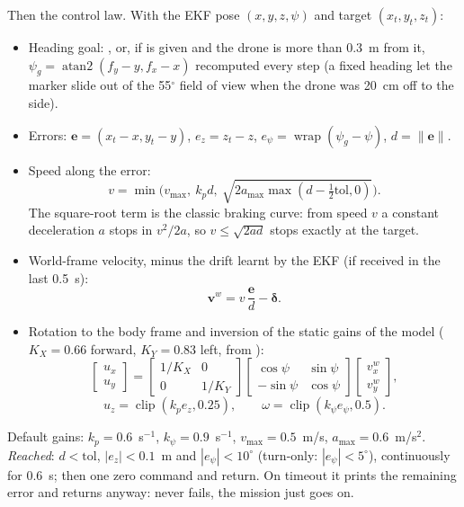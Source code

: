 Then the control law. With the EKF pose $(x,y,z,\psi)$ and target $(x_t,y_t,z_t)$:
\begin{itemize}[nosep]
  \item Heading goal: , or, if  is given and the drone is more than 0.3~m from it,
        $\psi_g = \operatorname{atan2}(f_y - y, f_x - x)$ recomputed every step (a fixed heading let the marker
        slide out of the 55$^\circ$ field of view when the drone was 20~cm off to the side).
  \item Errors: $\mathbf e = (x_t - x, y_t - y)$, $e_z = z_t - z$, $e_\psi = \operatorname{wrap}(\psi_g - \psi)$,
        $d = \lVert\mathbf e\rVert$.
  \item Speed along the error:
        $$ v = \min\Big( v_{\max},\ k_p d,\ \sqrt{2 a_{\max} \max(d - \tfrac{1}{2}\text{tol}, 0)} \Big). $$
        The square-root term is the classic braking curve: from speed $v$ a constant deceleration $a$ stops in
        $v^2/2a$, so $v \le \sqrt{2ad}$ stops exactly at the target.
  \item World-frame velocity, minus the drift learnt by the EKF (if received in the last 0.5~s):
        $$ \mathbf v^w = v\,\frac{\mathbf e}{d} - \boldsymbol\delta . $$
  \item Rotation to the body frame and inversion of the static gains of the model
        ($K_X = 0.66$ forward, $K_Y = 0.83$ left, from ):
$$
\begin{bmatrix} u_x \\ u_y \end{bmatrix} =
\begin{bmatrix} 1/K_X & 0 \\ 0 & 1/K_Y \end{bmatrix}
\begin{bmatrix} \cos\psi & \sin\psi \\ -\sin\psi & \cos\psi \end{bmatrix}
\begin{bmatrix} v^w_x \\ v^w_y \end{bmatrix},
$$
$$
u_z = \operatorname{clip}(k_p e_z, 0.25),\qquad
\omega = \operatorname{clip}(k_\psi e_\psi, 0.5).
$$
\end{itemize}
Default gains: $k_p = 0.6$~s$^{-1}$, $k_\psi = 0.9$~s$^{-1}$, $v_{\max}=0.5$~m/s, $a_{\max} = 0.6$~m/s$^2$.
\emph{Reached}: $d<\text{tol}$, $|e_z|<0.1$~m and $|e_\psi|<10^\circ$ (turn-only: $|e_\psi|<5^\circ$),
continuously for 0.6~s; then one zero command and return. On timeout it prints the remaining error and returns
anyway:  never fails, the mission just goes on.

